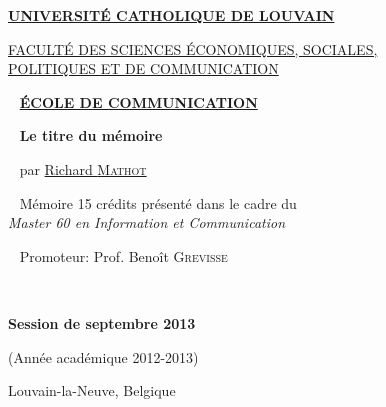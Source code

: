 
\begin{center}

\Large \href{http://www.uclouvain.be/}{\textbf{UNIVERSITÉ CATHOLIQUE DE LOUVAIN}}

\large \href{http://www.uclouvain.be/espo}{FACULTÉ DES SCIENCES ÉCONOMIQUES, SOCIALES, \\
POLITIQUES ET DE COMMUNICATION}

~ \vfill
\large \href{http://www.uclouvain.be/comu}{\textbf{ÉCOLE DE COMMUNICATION}}

~ \vfill
\huge\textbf{Le titre du mémoire}%

~ \vfill
\large par \href{mailto:richard.mathot@gmail.com}{Richard \textsc{Mathot}}

~ \vfill
\normalsize Mémoire 15 crédits présenté dans le cadre du \\
\emph{Master 60 en Information et Communication}

\end{center}


~ \vfill
\hspace{8cm} Promoteur: Prof. Benoît \textsc{Grevisse}



~ \vfill

\begin{center}
\normalsize \textbf{Session de septembre 2013}

(Année académique 2012-2013)

Louvain-la-Neuve, Belgique
\end{center}

\thispagestyle{empty}

